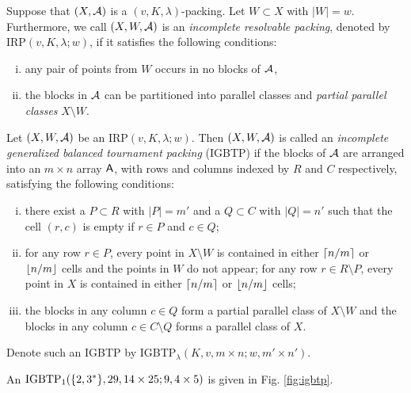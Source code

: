 \documentclass[draft, 11pt]{article}
\begin{document}
 Suppose that $(X,\mathcal A)$ is a $(v,K,\lambda)$-packing. Let $W\subset X$ with $|W|=w$.
 Furthermore, we call $(X,W,\mathcal A)$ is an {\em incomplete resolvable packing},
 denoted by IRP$(v,K,\lambda;w)$, if it satisfies the following conditions:
 \begin{enumerate}[(i)]
 \item any pair of points from
 $W$ occurs in no blocks of $\mathcal A$,
 \item the blocks in $\mathcal A$ can be partitioned
 into parallel classes and {\em partial parallel classes} $X\setminus W$.%
 \end{enumerate}

 \begin{definition}\label{defn:igbtp}
 Let $(X,W,\mathcal A)$ be an IRP$(v,K,\lambda;w)$.
 Then $(X,W,\mathcal A)$ is called an {\em incomplete generalized balanced tournament
 packing} (IGBTP)
 if the blocks of $\mathcal A$ are arranged into an $m\times n$ array $\sf A$, with rows and columns 
 indexed by $R$ and $C$ respectively,
 satisfying the following conditions:
 \begin{enumerate}[(i)]
 \item there exist a $P\subset R$ with $|P|=m'$ and a $Q\subset C$ with $|Q|=n'$ such that the cell $(r,c)$ is empty
 if $r\in P$ and $c\in Q$;
 \item for any row $r\in P$, every point in $X\setminus W$ is contained in
 either  $\left\lceil{n/m}\right\rceil$ or $\left\lfloor{n/m}\right\rfloor$ cells and the points
 in $W$ do not appear; for any row $r\in R\setminus P$, every
 point in $X$ is contained in either  $\left\lceil{n/m}\right\rceil$ or $\left\lfloor{n/m}\right\rfloor$
 cells;
 \item the blocks in any column $c\in Q$ form a partial parallel class of $X\setminus W$ and the blocks in any column
 $c\in C\setminus Q$ forms a parallel class of $X$.
 \end{enumerate}
 
 Denote such an IGBTP by IGBTP$_\lambda(K,v,m\times n;w,m'\times n')$.
 \end{definition}
                                                      

 \begin{example}
 \label{eg:igbtp} An ${\rm IGBTP}_1(\{2,3^*\},29, 14\times 25; 9,4\times 5)$ is given in Fig.
 \ref{fig:igbtp}.
 \end{example}
 
\end{document}
